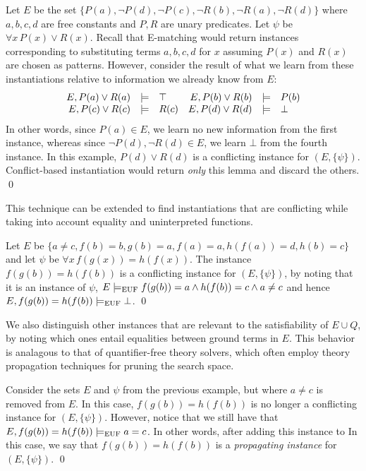 \documentclass[oribibl]{llncs}
\begin{document}
\begin{example}
Let $E$ be the set $\{ P(a), \neg P(d), \neg P( c ), \neg R(b), \neg R(a), \neg R(d) \}$ where $a,b,c,d$ are free constants and $P,R$ are unary predicates.
Let $\psi$ be $\forall x\, P( x ) \vee R( x )$.
Recall that E-matching would return instances corresponding to substituting terms $a,b,c,d$ for $x$
assuming $P( x )$ and $R( x )$ are chosen as patterns.
However, consider the result of what we learn from these instantiations relative to information we already know from $E$:
\[
\begin{array}{rcl@{\hspace{1em}}rcl}
E, P( a ) \vee R( a ) &\models& \top &
E, P( b ) \vee R( b ) &\models& P( b ) \\
E, P( c ) \vee R( c ) &\models& R( c ) &
E, P( d ) \vee R( d ) &\models& \bot \\
\end{array}
\]
In other words, since $P( a ) \in E$, we learn no new information from the first instance,
whereas since $\neg P( d ), \neg R( d ) \in E$, we learn $\bot$ from the fourth instance.
In this example, $P( d ) \vee R( d )$ is a conflicting instance for $( E, \{ \psi \} )$.
Conflict-based instantiation would return \emph{only} this lemma and discard the others.
\qed
\end{example}
This technique can be extended to find instantiations that are conflicting while taking into account equality and uninterpreted functions.
\begin{example}
Let $E$ be $\{ a \neq c, f( b ) = b, g( b ) = a, f( a ) = a, h( f( a ) ) = d, h( b ) =c \}$ and let $\psi$ be
$\forall x\, f( g( x ) ) = h( f( x ) )$. 
The instance $f( g( b ) ) = h( f( b ) )$ is a conflicting instance for $( E, \{ \psi \} )$,
by noting that it is an instance of $\psi$,
$E \models_\mathrm{EUF} f( g( b ) ) = a \wedge h( f( b ) ) = c \wedge a \neq c$
and hence $E, f( g( b ) ) = h( f( b ) ) \models_\mathrm{EUF} \bot$.
\qed
\end{example}
We also distinguish other instances that are relevant to the satisfiability of $E \cup Q$,
by noting which ones entail equalities between ground terms in $E$.
This behavior is analagous to that of quantifier-free theory solvers, which often employ
theory propagation techniques for pruning the search space.
\begin{example}
Consider the sets $E$ and $\psi$ from the previous example, but where $a \neq c$ is removed from $E$.
In this case, $f( g( b ) ) = h( f( b ) )$ is no longer a conflicting instance for $( E, \{ \psi \} )$.
However, notice that we still have that $E, f( g( b ) ) = h( f( b ) ) \models_\mathrm{EUF} a = c$.
In other words, after adding this instance to 
In this case, we say that $f( g( b ) ) = h( f( b ) )$ is a \emph{propagating instance} for $( E, \{ \psi \} )$.
\qed
\end{example}
\end{document}
